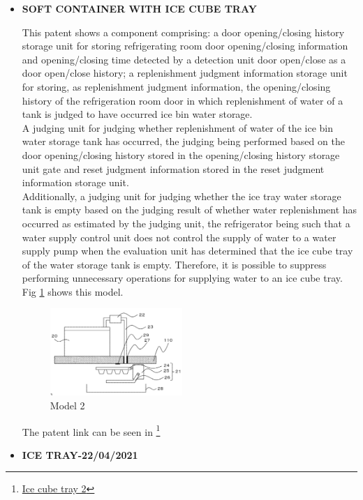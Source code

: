 \documentclass[12pt, twoside]{report}
\begin{document}
\begin{itemize}
The patent link can be seen in \footnote{\href{https://data.inpi.fr/brevets/WO2020185345}{Ice cube tray 1}}


\item \textbf{SOFT CONTAINER WITH ICE CUBE TRAY}

This patent shows a component comprising: a door opening/closing history storage unit for storing refrigerating room door opening/closing information and opening/closing time detected by a detection unit door open/close as a door open/close history; a replenishment judgment information storage unit for storing, as replenishment judgment information, the opening/closing history of the refrigeration room door in which replenishment of water of a tank is judged to have occurred ice bin water storage.\\
A judging unit for judging whether replenishment of water of the ice bin water storage tank has occurred, the judging being performed based on the door opening/closing history stored in the opening/closing history storage unit gate and reset judgment information stored in the reset judgment information storage unit.\\
Additionally, a judging unit for judging whether the ice tray water storage tank is empty based on the judging result of whether water replenishment has occurred as estimated by the judging unit, the refrigerator being such that a water supply control unit does not control the supply of water to a water supply pump when the evaluation unit has determined that the ice cube tray of the water storage tank is empty. Therefore, it is possible to suppress performing unnecessary operations for supplying water to an ice cube tray. Fig \ref{fig:model2} shows this model.
\begin{figure}[H]
    \centering
    \includegraphics[width=50mm,scale=0.5]{images/Project2/innovation2.png}
    \caption{Model 2}
    \label{fig:model2}
\end{figure}
    
The patent link can be seen in \footnote{\href{https://data.inpi.fr/brevets/WO2020129242}{Ice cube tray 2}}

\item \textbf{ICE TRAY-22/04/2021}


\end{itemize}
\end{document}
